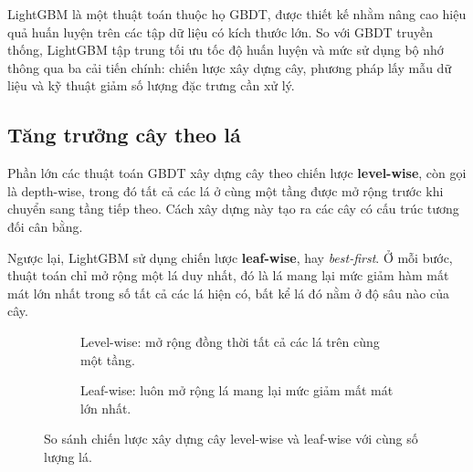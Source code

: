 \documentclass[a4paper]{report}
\begin{document}
LightGBM là một thuật toán thuộc họ GBDT,
được thiết kế nhằm nâng cao hiệu quả huấn luyện trên các tập dữ liệu có kích
thước lớn. So với GBDT truyền thống, LightGBM tập trung tối ưu tốc độ huấn
luyện và mức sử dụng bộ nhớ thông qua ba cải tiến chính: chiến lược xây dựng
cây, phương pháp lấy mẫu dữ liệu và kỹ thuật giảm số lượng đặc trưng cần xử lý.

\subsection{Tăng trưởng cây theo lá}

Phần lớn các thuật toán GBDT xây dựng cây theo chiến lược
\textbf{level-wise}, còn gọi là depth-wise, trong đó tất cả các lá ở cùng một tầng
được mở rộng trước khi chuyển sang tầng tiếp theo. Cách xây dựng này tạo ra các
cây có cấu trúc tương đối cân bằng.

Ngược lại, LightGBM sử dụng chiến lược \textbf{leaf-wise}, hay
\textit{best-first}. Ở mỗi bước, thuật toán chỉ mở rộng một lá duy nhất, đó là
lá mang lại mức giảm hàm mất mát lớn nhất trong số tất cả các lá hiện có, bất
kể lá đó nằm ở độ sâu nào của cây.

\begin{figure}[H]
  \centering
  \begin{subfigure}[b]{0.47\textwidth}
    \centering
    \caption{Level-wise: mở rộng đồng thời tất cả các lá trên cùng một tầng.}
  \end{subfigure}
  \hfill
  \begin{subfigure}[b]{0.47\textwidth}
    \centering
    \caption{Leaf-wise: luôn mở rộng lá mang lại mức giảm mất mát lớn nhất.}
  \end{subfigure}
  \caption{So sánh chiến lược xây dựng cây level-wise và leaf-wise với cùng số
  lượng lá.}
  \label{fig:growth}
\end{figure}
\end{document}
